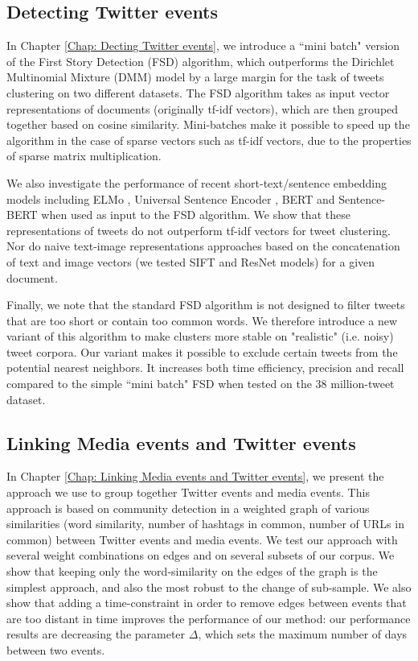 \subsection{Detecting Twitter events}
In Chapter \ref{Chap: Decting Twitter events}, we introduce a ``mini batch" version of the First Story Detection (FSD) \citep{allan_introduction_2002} algorithm, which outperforms the Dirichlet Multinomial Mixture (DMM) model \citep{yin_dirichlet_2014} by a large margin for the task of tweets clustering on two different datasets. The FSD algorithm takes as input vector representations of documents (originally tf-idf vectors), which are then grouped together based on cosine similarity. Mini-batches make it possible to speed up the algorithm in the case of sparse vectors such as tf-idf vectors, due to the properties of sparse matrix multiplication. 

We also investigate the performance of recent short-text/sentence embedding models including ELMo \citep{peters2018deep}, Universal Sentence Encoder \citep{cer2018universal}, BERT \citep{devlin2018bert} and Sentence-BERT \citep{reimers_2019_sentence} when used as input to the FSD algorithm. We show that these representations of tweets do not outperform tf-idf vectors for tweet clustering. Nor do naive text-image representations approaches based on the concatenation of text and image vectors (we tested SIFT \citep{lowe1999object} and ResNet \citep{he2016deep} models) for a given document.

Finally, we note that the standard FSD algorithm is not designed to filter tweets that are too short or contain too common words. We therefore introduce a new variant of this algorithm to make clusters more stable on "realistic" (i.e. noisy) tweet corpora. Our variant makes it possible to exclude certain tweets from the potential nearest neighbors. It increases both time efficiency, precision and recall compared to the simple ``mini batch" FSD when tested on the 38 million-tweet dataset.

\subsection{Linking Media events and Twitter events}

In Chapter \ref{Chap: Linking Media events and Twitter events}, we present the approach we use to group together Twitter events and media events. This approach is based on community detection in a weighted graph of various similarities (word similarity, number of hashtags in common, number of URLs in common) between Twitter events and media events. We test our approach with several weight combinations on edges and on several subsets of our corpus. We show that keeping only the word-similarity on the edges of the graph is the simplest approach, and also the most robust to the change of sub-sample. We also show that adding a time-constraint in order to remove edges between events that are too distant in time improves the performance of our method: our performance results are decreasing the parameter $\Delta$, which sets the maximum number of days between two events.

